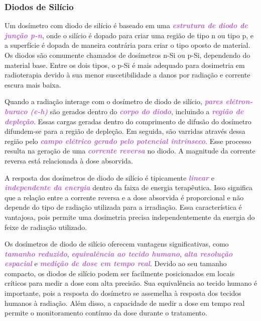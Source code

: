 \documentclass[11pt,a4paper]{article}
\begin{document}
\subsubsection*{Diodos de Silício}

	Um dosímetro com diodo de silício é baseado em uma \textcolor{MediumOrchid}{\textit{\textbf{estrutura de diodo de junção p-n}}}, onde o silício é dopado para criar uma região de tipo n ou tipo p, e a superfície é dopada de maneira contrária para criar o tipo oposto de material. Os diodos são comumente chamados de dosímetros n-Si ou p-Si, dependendo do material base. Entre os dois tipos, o p-Si é mais adequado para dosimetria em radioterapia devido à sua menor suscetibilidade a danos por radiação e corrente escura mais baixa.

	Quando a radiação interage com o dosímetro de diodo de silício, \textcolor{MediumOrchid}{\textit{\textbf{pares elétron-buraco (e-h)}}} são gerados dentro do \textcolor{MediumOrchid}{\textit{\textbf{corpo do diodo}}}, incluindo a \textcolor{MediumOrchid}{\textit{\textbf{região de depleção}}}. Essas cargas geradas dentro do comprimento de difusão do dosímetro difundem-se para a região de depleção. Em seguida, são varridas através dessa região pelo \textcolor{MediumOrchid}{\textit{\textbf{campo elétrico gerado pelo potencial intrínseco}}}. Esse processo resulta na geração de uma \textcolor{MediumOrchid}{\textit{\textbf{corrente reversa}}} no diodo. A magnitude da corrente reversa está relacionada à dose absorvida.

	A resposta dos dosímetros de diodo de silício é tipicamente \textcolor{MediumOrchid}{\textit{\textbf{linear}}} e \textcolor{MediumOrchid}{\textit{\textbf{independente da energia}}} dentro da faixa de energia terapêutica. Isso significa que a relação entre a corrente reversa e a dose absorvida é proporcional e não depende do tipo de radiação utilizada para a irradiação. Essa característica é vantajosa, pois permite uma dosimetria precisa independentemente da energia do feixe de radiação utilizado.

	Os dosímetros de diodo de silício oferecem vantagens significativas, como \textcolor{MediumOrchid}{\textit{\textbf{tamanho reduzido}}}, \textcolor{MediumOrchid}{\textit{\textbf{equivalência ao tecido humano}}}, \textcolor{MediumOrchid}{\textit{\textbf{alta resolução espacial}}} e \textcolor{MediumOrchid}{\textit{\textbf{medição de dose em tempo real}}}. Devido ao seu tamanho compacto, os diodos de silício podem ser facilmente posicionados em locais críticos para medir a dose com alta precisão. Sua equivalência ao tecido humano é importante, pois a resposta do dosímetro se assemelha à resposta dos tecidos humanos à radiação. Além disso, a capacidade de medir a dose em tempo real permite o monitoramento contínuo da dose durante o tratamento.
\end{document}
